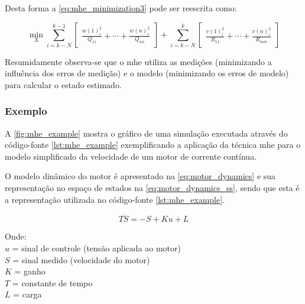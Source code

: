 Desta forma a \cref{eq:mhe_minimization3} pode ser reescrita como:

\begin{equation}
	\label{eq:mhe_minimization4}
	\min_{X} \sum_{i=k-N}^{k-1} \begin{bmatrix} \frac{w(1)^2_i}{Q_{11}} + \cdots + \frac{w(n)^2_i}{Q_{nn}} \end{bmatrix} + 
			\sum_{i=k-N}^{k} \begin{bmatrix} \frac{v(1)^2_i}{R_{11}} + \cdots + \frac{v(n)^2_i}{R_{mm}} \end{bmatrix}
\end{equation}

Resumidamente observa-se que o \acrshort{mhe} utiliza as medições (minimizando a influência dos
erros de medição) e o modelo (minimizando os erros de modelo) para calcular o estado estimado.

\subsubsection{Exemplo}
\label{subsubsec:mhe_example}

A \cref{fig:mhe_example} mostra o gráfico de uma simulação executada através do código-fonte \ref{lst:mhe_example}
exemplificando a aplicação da técnica \acrlong{mhe} para o modelo simplificado da velocidade de um motor de corrente
contínua.

O modelo dinâmico do motor é apresentado na \cref{eq:motor_dynamics} e sua representação no espaço de estados
na \cref{eq:motor_dynamics_ss}, sendo que esta é a representação utilizada no código-fonte \ref{lst:mhe_example}.

\begin{equation}
	\label{eq:motor_dynamics}
	T \dot{S} = -S + Ku + L
\end{equation}

\noindent
Onde: 												\\
$u$ = sinal de controle (tensão aplicada ao motor)	\\
$S$ = sinal medido (velocidade do motor)			\\
$K$ = ganho 										\\
$T$ = constante de tempo 							\\
$L$ = carga

